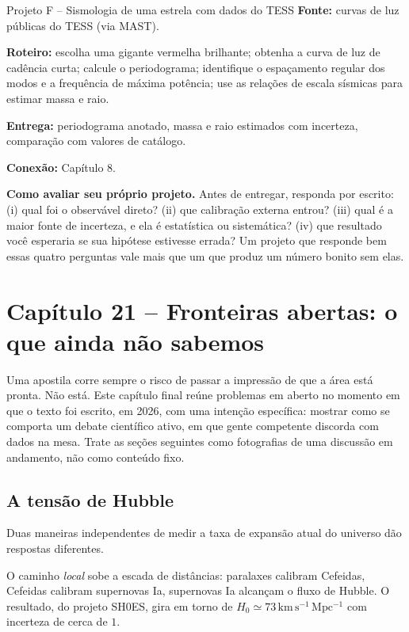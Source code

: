 \documentclass[11pt,a4paper]{article}
\begin{document}
\begin{lessonblock}{Projeto F -- Sismologia de uma estrela com dados do TESS}
\textbf{Fonte:} curvas de luz públicas do TESS (via MAST).

\textbf{Roteiro:} escolha uma gigante vermelha brilhante; obtenha a curva de luz de cadência curta; calcule o periodograma; identifique o espaçamento regular dos modos e a frequência de máxima potência; use as relações de escala sísmicas para estimar massa e raio.

\textbf{Entrega:} periodograma anotado, massa e raio estimados com incerteza, comparação com valores de catálogo.

\textbf{Conexão:} Capítulo 8.
\end{lessonblock}

\textbf{Como avaliar seu próprio projeto.} Antes de entregar, responda por escrito: (i) qual foi o observável direto? (ii) que calibração externa entrou? (iii) qual é a maior fonte de incerteza, e ela é estatística ou sistemática? (iv) que resultado você esperaria se sua hipótese estivesse errada? Um projeto que responde bem essas quatro perguntas vale mais que um que produz um número bonito sem elas.

\newpage
\section*{Capítulo 21 -- Fronteiras abertas: o que ainda não sabemos}
Uma apostila corre sempre o risco de passar a impressão de que a área está pronta. Não está. Este capítulo final reúne problemas em aberto no momento em que o texto foi escrito, em 2026, com uma intenção específica: mostrar como se comporta um debate científico ativo, em que gente competente discorda com dados na mesa. Trate as seções seguintes como fotografias de uma discussão em andamento, não como conteúdo fixo.

\subsection*{A tensão de Hubble}

Duas maneiras independentes de medir a taxa de expansão atual do universo dão respostas diferentes.

O caminho \emph{local} sobe a escada de distâncias: paralaxes calibram Cefeidas, Cefeidas calibram supernovas Ia, supernovas Ia alcançam o fluxo de Hubble. O resultado, do projeto SH0ES, gira em torno de $H_0\simeq73\,\mathrm{km\,s^{-1}\,Mpc^{-1}}$ com incerteza de cerca de $1$.
\end{document}
